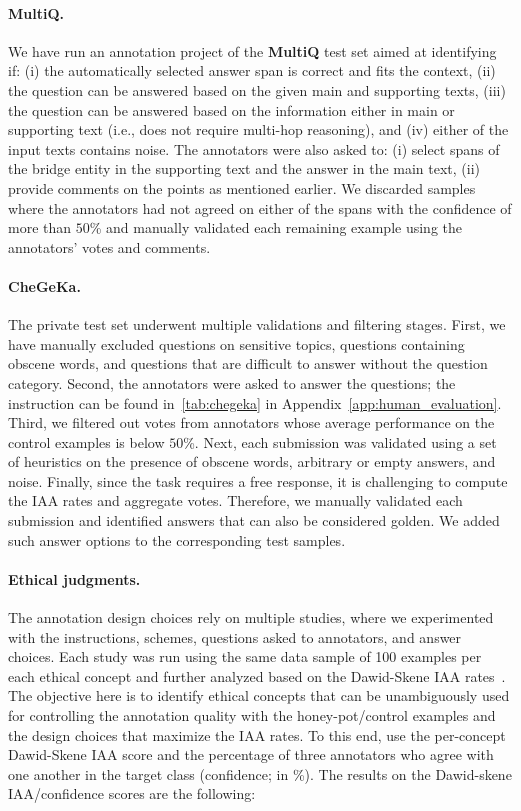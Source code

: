 \documentclass[11pt]{article}
\begin{document}
\paragraph{MultiQ.} We have run an annotation project of the \textbf{MultiQ} test set aimed at identifying if: (i) the automatically selected answer span is correct and fits the context, (ii) the question can be answered based on the given main and supporting texts, (iii) the question can be answered based on the information either in main or supporting text (i.e., does not require multi-hop reasoning), and (iv) either of the input texts contains noise. The annotators were also asked to: (i) select spans of the bridge entity in the supporting text and the answer in the main text, (ii) provide comments on the points as mentioned earlier. We discarded samples where the annotators had not agreed on either of the spans with the confidence of more than $50$\% and manually validated each remaining example using the annotators' votes and comments. 




\paragraph{CheGeKa.} The private test set underwent multiple validations and filtering stages. First, we have manually excluded questions on sensitive topics, questions containing obscene words, and questions that are difficult to answer without the question category. Second, the annotators were asked to answer the questions; the instruction can be found in~\autoref{tab:chegeka} in Appendix~\ref{app:human_evaluation}. Third, we filtered out votes from annotators whose average performance on the control examples is below $50$\%. Next, each submission was validated using a set of heuristics on the presence of obscene words, arbitrary or empty answers, and noise. Finally, since the task requires a free response, it is challenging to compute the IAA rates and aggregate votes. Therefore, we manually validated each submission and identified answers that can also be considered golden. We added such answer options to the corresponding test samples. 

\paragraph{Ethical judgments.} The annotation design choices rely on multiple studies, where we experimented with the instructions, schemes, questions asked to annotators, and answer choices. Each study was run using the same data sample of 100 examples per each ethical concept and further analyzed based on the Dawid-Skene IAA rates~\cite{dawid1979maximum}. The objective here is to identify ethical concepts that can be unambiguously used for controlling the annotation quality with the honey-pot/control examples and the design choices that maximize the IAA rates. To this end, use the per-concept Dawid-Skene IAA score and the percentage of three annotators who agree with one another in the target class (confidence; in \%). The results on the Dawid-skene IAA/confidence scores are the following:
\end{document}

